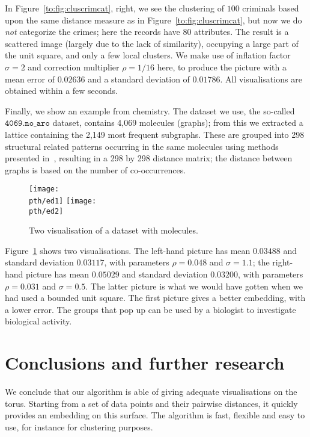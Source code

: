 \documentclass{article}
\theoremstyle{definition}
\begin{document}
In Figure~\ref{to:fig:cluscrimcat}, right, we see the clustering of $100$
criminals based upon the same distance measure as in
Figure~\ref{to:fig:cluscrimcat}, but now we do \emph{not} categorize the crimes;
here the records have 80 attributes. The result is a scattered image (largely
due to the lack of similarity), occupying a large part of the unit square, and
only a few local clusters. We make use of inflation factor $\sigma=2$ and
correction multiplier $\rho=1/16$ here, to produce the picture with a mean
error of $0.02636$ and a standard deviation of $0.01786$. All visualisations
are obtained within a few seconds.

Finally, we show an example from chemistry. The dataset we use, the so-called
$\mathtt{4069.no\_aro}$ dataset, contains 4,069 molecules (graphs); from this
we extracted a lattice containing the 2,149 most frequent subgraphs. These are
grouped into 298 structural related patterns occurring in the same molecules
using methods presented in~\cite{AIAI}, resulting in a 298 by 298 distance
matrix; the distance between graphs is based on the number of co-occurrences.

\begin{figure}[!ht]
\begin{center}
\texttt{[image: \\pth/ed1]}
\texttt{[image: \\pth/ed2]}
\caption{Two visualisation of a dataset with molecules.} \label{to:fig:clused}
\end{center}
\end{figure}

Figure~\ref{to:fig:clused} shows two visualisations. The left-hand picture has
mean $0.03488$ and standard deviation $0.03117$, with parameters $\rho = 0.048$
and $\sigma = 1.1$; the right-hand picture has mean $0.05029$ and standard
deviation $0.03200$, with parameters $\rho = 0.031$ and $\sigma = 0.5$. The
latter picture is what we would have gotten when we had used a bounded unit
square. The first picture gives a better embedding, with a lower error. The
groups that pop up can be used by a biologist to investigate biological
activity.

\section{Conclusions and further research}\label{to:conclusion}
We conclude that our algorithm is able of giving adequate visualisations on the
torus. Starting from a set of data points and their pairwise distances, it
quickly provides an embedding on this surface. The algorithm is fast, flexible
and easy to use, for instance for clustering purposes.
\end{document}
